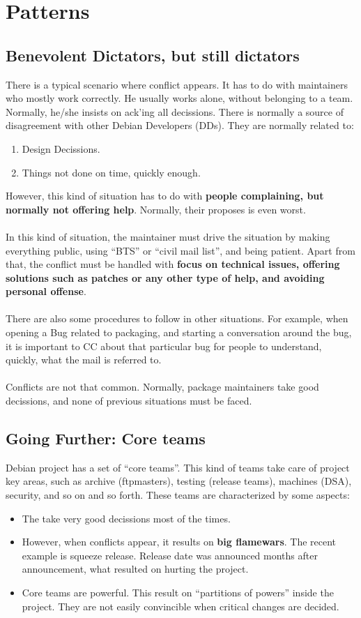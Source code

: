 \documentclass[11pt]{article}
\begin{document}
\section{Patterns}
\subsection{Benevolent Dictators, but still dictators}
There is a typical scenario where conflict appears. It has to do with maintainers who mostly work correctly. He usually works alone, without belonging to a team. Normally, he/she insists on ack'ing all decissions. There is normally a source of disagreement with other Debian Developers (DDs). They are normally related to:
\begin{enumerate}\itemsep0pt
\item{Design Decissions}.
\item{Things not done on time, quickly enough}.
\end{enumerate}
However, this kind of situation has to do with \textbf{people complaining, but normally not offering help}. Normally, their proposes is even worst.\\
\\
In this kind of situation, the maintainer must drive the situation by making everything public, using  ``BTS'' or ``civil mail list'', and being patient. Apart from that, the conflict must be handled with \textbf{focus on technical issues, offering solutions such as patches or any other type of help, and avoiding personal offense}.\\
\\
There are also some procedures to follow in other situations. For example, when opening a Bug related to packaging, and starting a conversation around the bug, it is important to CC about that particular bug for people to understand, quickly, what the mail is referred to.\\
\\
Conflicts are not that common. Normally, package maintainers take good decissions, and none of previous situations must be faced.

\subsection{Going Further: Core teams}
Debian project has a set of ``core teams''. This kind of teams take care of project key areas, such as archive (ftpmasters), testing (release teams), machines (DSA), security, and so on and so forth.
These teams are characterized by some aspects:
\begin{itemize}\itemsep0pt
\item{The take very good decissions most of the times}.
\item{However, when conflicts appear, it results on \textbf{big flamewars}}. The recent example is squeeze release. Release date was announced months after announcement, what resulted on hurting the project.
\item{Core teams are powerful}. This result on ``partitions of powers'' inside the project. They are not easily convincible when critical changes are decided.
\end{itemize}
\end{document}
